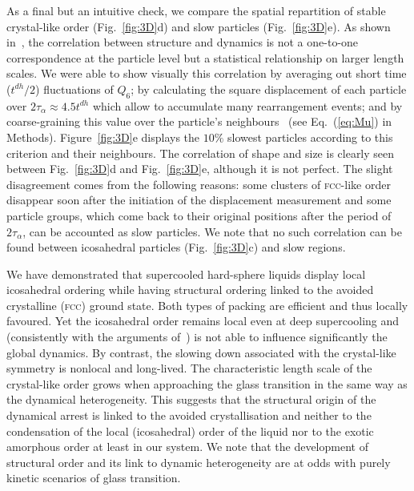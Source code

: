 As a final but an intuitive check, we compare the spatial repartition of stable crystal-like order (Fig.~\ref{fig:3D}d) and slow particles (Fig.~\ref{fig:3D}e). As shown in~\citep{Berthier2007}, the correlation between structure and dynamics is not a one-to-one correspondence at the particle level but a statistical relationship on larger length scales. We were able to show visually this correlation by averaging out short time ($t^{dh}/2$) fluctuations of $Q_6$; by calculating the square displacement of each particle over $2\tau_\alpha\approx 4.5t^{dh}$ which allow to accumulate many rearrangement events; and by coarse-graining this value over the particle's neighbours~\citep{Berthier2007} (see Eq.~(\ref{eq:Mu}) in Methods). Figure~\ref{fig:3D}e displays the $10\%$ slowest particles according to this criterion and their neighbours. The correlation of shape and size is clearly seen between Fig.~\ref{fig:3D}d and Fig.~\ref{fig:3D}e, although it is not perfect. The slight disagreement comes from the following reasons: some clusters of \textsc{fcc}-like order disappear soon after the initiation of the displacement measurement and some particle groups, which come back to their original positions after the period of $2\tau_\alpha$, can be accounted as slow particles. We note that no such correlation can be found between icosahedral particles (Fig.~\ref{fig:3D}c) and slow regions.



We have demonstrated that supercooled hard-sphere liquids display local icosahedral ordering while having structural ordering linked to the avoided crystalline (\textsc{fcc}) ground state. Both types of packing are efficient and thus locally favoured. Yet the icosahedral order remains local even at deep supercooling and (consistently with the arguments of~\citep{Berthier2007}) is not able to influence significantly the global dynamics. By contrast, the slowing down associated with the crystal-like symmetry is nonlocal and long-lived. The characteristic length scale of the crystal-like order grows when approaching the glass transition in the same way as the dynamical heterogeneity. This suggests that the structural origin of the dynamical arrest is linked to the avoided crystallisation and neither to the condensation of the local (icosahedral) order of the liquid nor to the exotic amorphous order at least in our system. We note that the development of structural order and its link to dynamic heterogeneity are at odds with purely kinetic scenarios of glass transition. 

